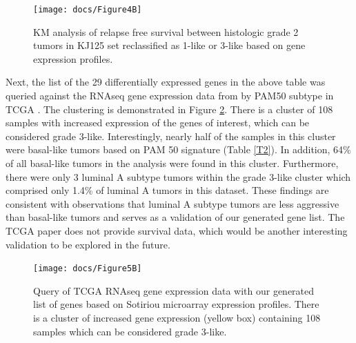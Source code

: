 \documentclass[a4paper,10pt]{article}
\begin{document}
 \begin{figure}
\centering
\texttt{[image: docs/Figure4B]}
\caption{ KM analysis of relapse free survival between 
histologic grade 2 tumors in KJ125 set reclassified as 
1-like or 3-like based on gene expression profiles.}\label{4B}
\end{figure}

Next, the list of the 29 differentially expressed genes in the above table was queried against 
the RNAseq gene expression data from by PAM50 subtype in TCGA \cite{Nature1}.  
The clustering is demonstrated in Figure \ref{5B}.  There is a cluster of 108 samples with 
increased expression of the genes of interest, which can be considered grade 3-like. 
 Interestingly, nearly half of the samples in this cluster were basal-like tumors based on 
PAM 50 signature (Table \ref{T2}).  In addition, 64\% of all basal-like tumors in the 
analysis were found in this cluster. Furthermore, there were only 3 luminal A subtype
 tumors within the grade 3-like cluster which comprised only 1.4\% of luminal A tumors
 in this dataset. These findings are consistent with observations that luminal A subtype
 tumors are less aggressive than basal-like tumors and serves as a validation of our 
generated gene list. The TCGA paper does not provide survival data, which would 
be another interesting validation to be explored in the future.\\

 \begin{figure}
\centering
\texttt{[image: docs/Figure5B]}
\caption{ Query of TCGA RNAseq gene expression data with our generated list of genes 
based on Sotiriou microarray expression profiles.  There is a cluster of increased gene 
expression (yellow box) containing 108 samples which can be considered grade 3-like.}\label{5B}
\end{figure}
\end{document}
